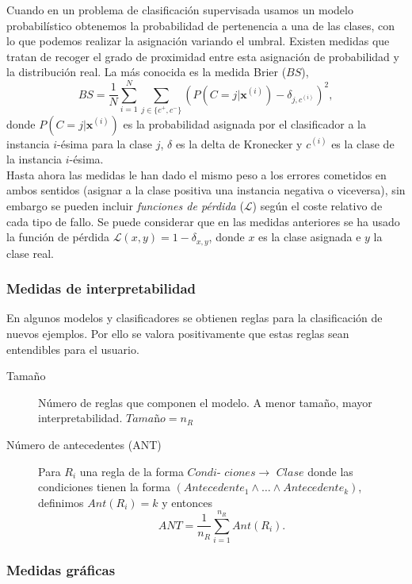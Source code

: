 	Cuando en un problema de clasificación supervisada usamos 
un modelo probabilístico obtenemos la probabilidad de 
pertenencia a una de las clases, con lo que podemos realizar 
la asignación variando el umbral. Existen medidas que tratan 
de recoger el grado de proximidad entre esta asignación de 
probabilidad y la distribución real. La más conocida es la 
medida Brier ($BS$),
	\[ BS = \frac{1}{N} \sum\limits_{i=1}^N 
		\sum\limits_{j \in \{c^+,c^-\}}
			\left( P \left( C=j|\mathbf{x}^{(i)} \right) -
			\delta_{j,c^{(i)}} \right) ^2,\]
	donde $P\left(C=j|\mathbf{x}^{(i)}\right)$ es la 
probabilidad asignada por el clasificador a la instancia 
$i$-ésima para la clase $j$, $\delta$ es la delta de 
Kronecker y $c^{(i)}$ es la clase de la instancia 
$i$-ésima.\\
	Hasta ahora las medidas le han dado el mismo peso a los 
errores cometidos en ambos sentidos (asignar a la clase 
positiva una instancia negativa o viceversa), sin embargo se 
pueden incluir \textit{funciones de pérdida} ($\mathcal{L}$) 
según el coste relativo de cada tipo de fallo. Se 
puede considerar que en las medidas anteriores se ha usado 
la función de pérdida 
$\mathcal{L}(x,y) = 1 - \delta_{x,y} $, donde $x$ es la clase 
asignada e $y$ la clase real.
	
\subsubsection*{Medidas de interpretabilidad} 
	En algunos modelos y clasificadores se obtienen reglas 
para la clasificación de nuevos ejemplos. Por ello se valora 
positivamente que estas reglas sean entendibles para el 
usuario. 
	\begin{description}
	\item[Tamaño] Número de reglas que componen el modelo. 
		A menor tamaño, mayor interpretabilidad. 
		$\textit{Tamaño} = n_R$
	\item[Número de antecedentes (ANT)] Para $R_i$ una regla 
		de la forma $\textit{Condi-}$ ${ciones } \rightarrow 
		\textit{ Clase}$ donde las condiciones tienen la 
		forma $(Antecedente_1 \wedge \dots \wedge 
		Antecedente_k)$, definimos $Ant(R_i) = k$ y entonces 
		\[ANT = \frac{1}{n_R} 
				\sum\limits_{i=1}^{n_R} Ant(R_i).\]
	\end{description}


\subsubsection*{Medidas gráficas}


